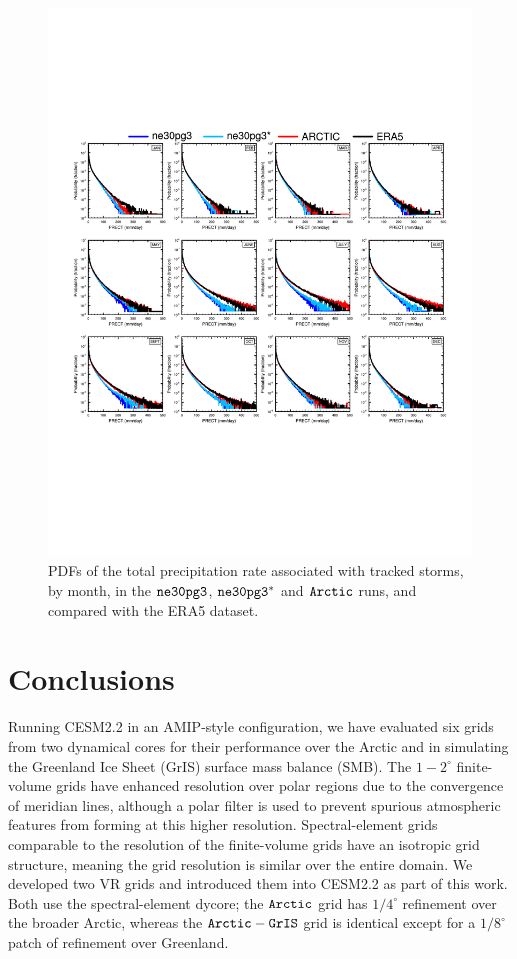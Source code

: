 \documentclass[draft]{agujournal2019}
\begin{document}
\begin{figure}[t]
\begin{center}
         \includegraphics[width=130mm]{figs/temp_composite_ge45N_pdf.pdf}
\end{center}
\caption{PDFs of the total precipitation rate associated with tracked storms, by month, in the $\tt ne30pg3$, $\tt ne30pg3^{*}$ and $\tt Arctic$ runs, and compared with the ERA5 dataset.}
\label{fig:comp-pdf}
\end{figure}

\section{Conclusions}\label{sec:conclusions}

Running CESM2.2 in an AMIP-style configuration, we have evaluated six grids from two dynamical cores for their performance over the Arctic and in simulating the Greenland Ice Sheet (GrIS) surface mass balance (SMB). The $1-2^{\circ}$ finite-volume grids have enhanced resolution over polar regions due to the convergence of meridian lines, although a polar filter is used to prevent spurious atmospheric features from forming at this higher resolution. Spectral-element grids comparable to the resolution of the finite-volume grids have an isotropic grid structure, meaning the grid resolution is similar over the entire domain.
We developed two VR grids and introduced them into CESM2.2 as part of this work. Both use the spectral-element dycore; the $\tt Arctic$ grid has $1/4^{\circ}$ refinement over the broader Arctic, whereas the $\tt Arctic-GrIS$ grid is identical except for a $1/8^{\circ}$ patch of refinement over Greenland.
\end{document}
